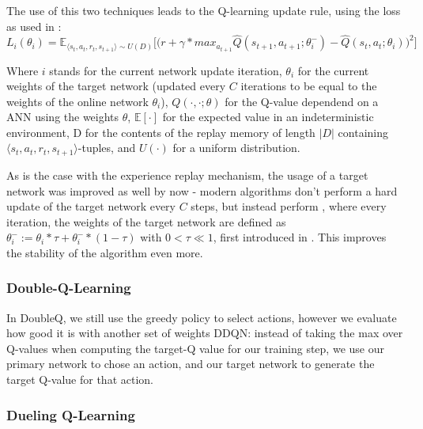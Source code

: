 The use of this two techniques leads to the Q-learning update rule, using the loss as used in \cite{mnih_human-level_2015}:
\begin{equation} \label{qloss_target}
	L_i(\theta_i) = \mathds{E}_{\langle s_t,a_t,r_t,s_{t+1} \rangle \sim U(D)} \Bigg[\Big( r + \gamma * max_{a_{t+1}} \hat{Q}(s_{t+1}, a_{t+1}; \theta^-_i) - \hat{Q}(s_t,a_t;\theta_i) \Big)^2\Bigg]
\end{equation}
\begin{flushright}
	\scriptsize
	Where $i$ stands for the current network update iteration, $\theta_i$ for the current weights of the target network (updated every $C$ iterations to be equal to the weights of the online network $\theta_i$), $Q(\cdot,\cdot;\theta)$ for the Q-value dependend on a ANN using the weights $\theta$, $\mathds{E}[\cdot]$ for the expected value in an indeterministic environment, D for the contents of the replay memory of length $\lvert D \rvert$ containing $\langle s_t,a_t,r_t,s_{t+1} \rangle$-tuples, and $U(\cdot)$ for a uniform distribution.
\end{flushright}
As is the case with the experience replay mechanism, the usage of a target network was improved as well by now - modern algorithms don't perform a hard update of the target network every $C$ steps, but instead perform , where every iteration, the weights of the target network are defined as $\theta^-_i := \theta_i * \tau + \theta^-_i * (1-\tau)$ with $0 < \tau \ll 1$, first introduced in \cite{lillicrap_continuous_2015}. This improves the stability of the algorithm even more.\\


\subsubsection{Double-Q-Learning}
In DoubleQ, we still use the greedy policy to select actions, however we evaluate how good it is with another set of weights
DDQN: instead of taking the max over Q-values when computing the target-Q value for our training step, we use our primary network to chose an action, and our target network to generate the target Q-value for that action. 

\subsubsection{Dueling Q-Learning}

